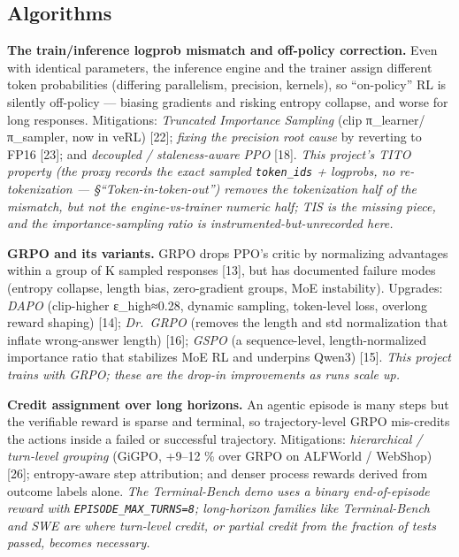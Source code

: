 \documentclass[
  paper=a4,
  ,captions=tableheading
]{scrartcl}
\begin{document}
\hypertarget{algorithms}{%
\subsection{Algorithms}\label{algorithms}}

\textbf{The train/inference logprob mismatch and off-policy correction.}
Even with identical parameters, the inference engine and the trainer
assign different token probabilities (differing parallelism, precision,
kernels), so ``on-policy'' RL is silently off-policy --- biasing
gradients and risking entropy collapse, and worse for long responses.
Mitigations: \emph{Truncated Importance Sampling} (clip
π\_learner/π\_sampler, now in veRL) {[}22{]}; \emph{fixing the precision
root cause} by reverting to FP16 {[}23{]}; and \emph{decoupled /
staleness-aware PPO} {[}18{]}. \emph{This project's TITO property (the
proxy records the exact sampled \texttt{token\_ids} + logprobs, no
re-tokenization --- §``Token-in-token-out'') removes the tokenization
half of the mismatch, but not the engine-vs-trainer numeric half; TIS is
the missing piece, and the importance-sampling ratio is
instrumented-but-unrecorded here.}

\textbf{GRPO and its variants.} GRPO drops PPO's critic by normalizing
advantages within a group of K sampled responses {[}13{]}, but has
documented failure modes (entropy collapse, length bias, zero-gradient
groups, MoE instability). Upgrades: \emph{DAPO} (clip-higher
ε\_high≈0.28, dynamic sampling, token-level loss, overlong reward
shaping) {[}14{]}; \emph{Dr.~GRPO} (removes the length and std
normalization that inflate wrong-answer length) {[}16{]}; \emph{GSPO} (a
sequence-level, length-normalized importance ratio that stabilizes MoE
RL and underpins Qwen3) {[}15{]}. \emph{This project trains with GRPO;
these are the drop-in improvements as runs scale up.}

\textbf{Credit assignment over long horizons.} An agentic episode is
many steps but the verifiable reward is sparse and terminal, so
trajectory-level GRPO mis-credits the actions inside a failed or
successful trajectory. Mitigations: \emph{hierarchical / turn-level
grouping} (GiGPO, +9--12 \% over GRPO on ALFWorld / WebShop) {[}26{]};
entropy-aware step attribution; and denser process rewards derived from
outcome labels alone. \emph{The Terminal-Bench demo uses a binary
end-of-episode reward with \texttt{EPISODE\_MAX\_TURNS=8}; long-horizon
families like Terminal-Bench and SWE are where turn-level credit, or
partial credit from the fraction of tests passed, becomes necessary.}
\end{document}

